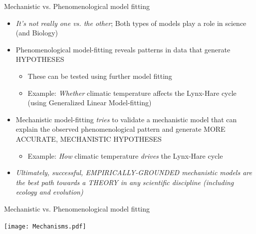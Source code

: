 \documentclass[xcolor=x11names,compress]{beamer}
\renewcommand{\(}{\begin{columns}}
\renewcommand{\)}{\end{columns}}
\newcommand{\<}[1]{\begin{column}{#1}}
\renewcommand{\>}{\end{column}}
\begin{document}
 
\begin{frame}{Mechanistic vs. Phenomenological model fitting}

	\begin{itemize}[<+->]\itemsep10pt
		\item {\it It's not really one vs. the other}; Both types of models play a role in science (and Biology)
		\item Phenomenological model-fitting reveals patterns in data that generate HYPOTHESES 
 		\begin{itemize}
			\item These can be tested using further model fitting
			\item Example: {\it Whether} climatic temperature affects the Lynx-Hare cycle (using Generalized Linear Model-fitting)
		\end{itemize} 

		\item Mechanistic model-fitting {\it tries} to validate a mechanistic model that can explain the observed phenomenological pattern and generate MORE ACCURATE, MECHANISTIC HYPOTHESES
		\begin{itemize}
			\item Example: {\it How} climatic temperature {\it drives} the Lynx-Hare cycle
		\end{itemize} 
		\item \it Ultimately, successful, EMPIRICALLY-GROUNDED mechanistic models are the best path towards a THEORY in any scientific discipline (including ecology and evolution)  
	  \end{itemize}
 
 
 \end{frame}

\begin{frame}{Mechanistic vs. Phenomenological model fitting}
	 
  \begin{center}
	  \texttt{[image: Mechanisms.pdf]}
  \end{center} 
 
 \end{frame}
\end{document}
